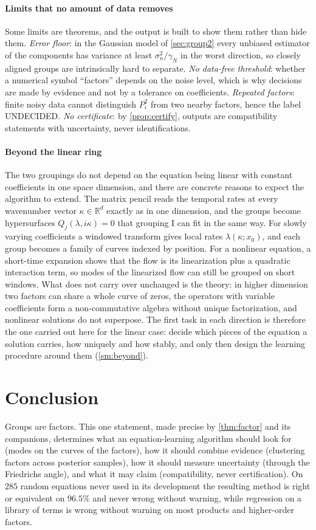 \documentclass[11pt]{article}
\theoremstyle{plain}
\theoremstyle{definition}
\theoremstyle{remark}
\newcommand{\R}{\mathbb{R}}
\newcommand{\gN}{\gamma_{N}}                %
\newcommand{\noise}{\sigma_{n}}             %
\newcommand{\lab}[1]{\textsf{#1}}           %
\newcommand{\UND}{\lab{UNDECIDED}}
\newcommand{\SMbeyond}{\cref{sm:beyond}}
\begin{document}
\paragraph{Limits that no amount of data removes} Some limits are theorems, and the output is built to show them rather
than hide them. \emph{Error floor}: in the Gaussian model of \cref{sec:group2} every unbiased estimator of the components
has variance at least $\noise^2/\gN$ in the worst direction, so closely aligned groups are intrinsically hard to separate.
\emph{No data-free threshold}: whether a numerical symbol ``factors'' depends on the noise level, which is why decisions are
made by evidence and not by a tolerance on coefficients. \emph{Repeated factors}: finite noisy data cannot distinguish
$P_i^2$ from two nearby factors, hence the label \UND. \emph{No certificate}: by \cref{prop:certify}, outputs are
compatibility statements with uncertainty, never identifications.

\paragraph{Beyond the linear ring} The two groupings do not depend on the equation being linear with constant
coefficients in one space dimension, and there are concrete reasons to expect the algorithm to extend. The matrix pencil
reads the temporal rates at every wavenumber vector $\kappa\in\R^d$ exactly as in one dimension, and the groups become
hypersurfaces $Q_j(\lambda,i\kappa)=0$ that grouping I can fit in the same way. For slowly varying coefficients a windowed
transform gives local rates $\lambda(\kappa;x_0)$, and each group becomes a family of curves indexed by position. For a
nonlinear equation, a short-time expansion shows that the flow is its linearization plus a quadratic interaction term,
so modes of the linearized flow can still be grouped on short windows. What does not carry over unchanged is the
theory: in higher dimension two factors can share a whole curve of zeros, the operators with variable coefficients form a
non-commutative algebra without unique factorization, and nonlinear solutions do not superpose. The first task in each
direction is therefore the one carried out here for the linear case: decide which pieces of the equation a solution
carries, how uniquely and how stably, and only then design the learning procedure around them (\SMbeyond).

\section{Conclusion}\label{sec:conclusion}
Groups are factors. This one statement, made precise by \cref{thm:factor} and its companions, determines what an
equation-learning algorithm should look for (modes on the curves of the factors), how it should combine evidence
(clustering factors across posterior samples), how it should measure uncertainty (through the Friedrichs angle), and
what it may claim (compatibility, never certification). On $285$ random equations never used in its development the
resulting method is right or equivalent on $96.5\%$ and never wrong without warning, while regression on a library of
terms is wrong without warning on most products and higher-order factors.
\end{document}
